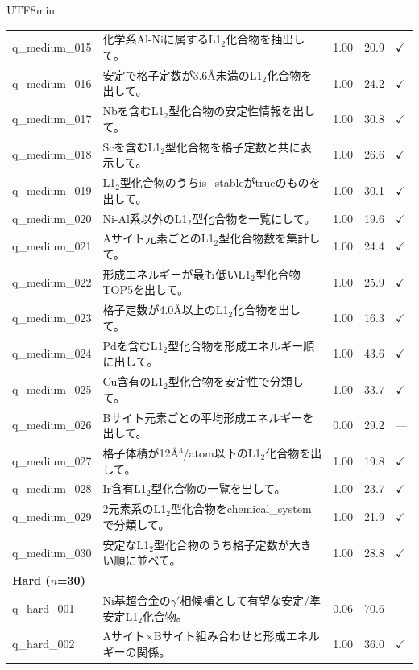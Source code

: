 \documentclass[sn-mathphys,Numbered]{sn-jnl}
\begin{document}
\begin{CJK}{UTF8}{min}
\begin{longtable}{lp{8.5cm}ccl}
    q\_medium\_015 & 化学系Al-Niに属するL1$_2$化合物を抽出して。 & 1.00 & 20.9 & $\checkmark$ \\
    q\_medium\_016 & 安定で格子定数が3.6\AA 未満のL1$_2$化合物を出して。 & 1.00 & 24.2 & $\checkmark$ \\
    q\_medium\_017 & Nbを含むL1$_2$型化合物の安定性情報を出して。 & 1.00 & 30.8 & $\checkmark$ \\
    q\_medium\_018 & Scを含むL1$_2$型化合物を格子定数と共に表示して。 & 1.00 & 26.6 & $\checkmark$ \\
    q\_medium\_019 & L1$_2$型化合物のうちis\_stableがtrueのものを出して。 & 1.00 & 30.1 & $\checkmark$ \\
    q\_medium\_020 & Ni-Al系以外のL1$_2$型化合物を一覧にして。 & 1.00 & 19.6 & $\checkmark$ \\
    q\_medium\_021 & Aサイト元素ごとのL1$_2$型化合物数を集計して。 & 1.00 & 24.4 & $\checkmark$ \\
    q\_medium\_022 & 形成エネルギーが最も低いL1$_2$型化合物TOP5を出して。 & 1.00 & 25.9 & $\checkmark$ \\
    q\_medium\_023 & 格子定数が4.0\AA 以上のL1$_2$化合物を出して。 & 1.00 & 16.3 & $\checkmark$ \\
    q\_medium\_024 & Pdを含むL1$_2$型化合物を形成エネルギー順に出して。 & 1.00 & 43.6 & $\checkmark$ \\
    q\_medium\_025 & Cu含有のL1$_2$型化合物を安定性で分類して。 & 1.00 & 33.7 & $\checkmark$ \\
    q\_medium\_026 & Bサイト元素ごとの平均形成エネルギーを出して。 & 0.00 & 29.2 & --- \\
    q\_medium\_027 & 格子体積が12\AA$^3$/atom以下のL1$_2$化合物を出して。 & 1.00 & 19.8 & $\checkmark$ \\
    q\_medium\_028 & Ir含有L1$_2$型化合物の一覧を出して。 & 1.00 & 23.7 & $\checkmark$ \\
    q\_medium\_029 & 2元素系のL1$_2$型化合物をchemical\_systemで分類して。 & 1.00 & 21.9 & $\checkmark$ \\
    q\_medium\_030 & 安定なL1$_2$型化合物のうち格子定数が大きい順に並べて。 & 1.00 & 28.8 & $\checkmark$ \\
    \midrule
    \multicolumn{5}{l}{\textbf{Hard ($n$=30)}} \\
    \midrule
    q\_hard\_001 & Ni基超合金の$\gamma'$相候補として有望な安定/準安定L1$_2$化合物。 & 0.06 & 70.6 & --- \\
    q\_hard\_002 & Aサイト$\times$Bサイト組み合わせと形成エネルギーの関係。 & 1.00 & 36.0 & $\checkmark$ \\

\end{longtable}
\end{CJK}
\end{document}
